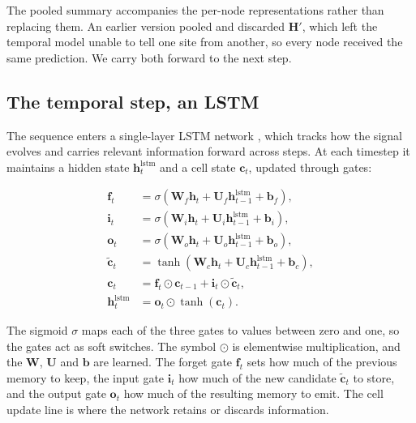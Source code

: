 \documentclass{article}
\begin{document}
The pooled summary accompanies the per-node representations rather than
replacing them. An earlier version pooled and discarded $\mathbf{H}'$, which
left the temporal model unable to tell one site from another, so every node
received the same prediction. We carry both forward to the next step.

\subsection{The temporal step, an LSTM}
\label{sec:lstm}

The sequence enters a single-layer LSTM network \citep{hochreiter1997lstm},
which tracks how the signal evolves and carries relevant information forward
across steps. At each timestep it maintains a hidden state
$\mathbf{h}_t^{\text{lstm}}$ and a cell state $\mathbf{c}_t$, updated through
gates:

\begin{equation}
  \label{eq:lstm}
  \begin{aligned}
    \mathbf{f}_t &= \sigma\!\left( \mathbf{W}_f \mathbf{h}_t + \mathbf{U}_f \mathbf{h}_{t-1}^{\text{lstm}} + \mathbf{b}_f \right), \\
    \mathbf{i}_t &= \sigma\!\left( \mathbf{W}_i \mathbf{h}_t + \mathbf{U}_i \mathbf{h}_{t-1}^{\text{lstm}} + \mathbf{b}_i \right), \\
    \mathbf{o}_t &= \sigma\!\left( \mathbf{W}_o \mathbf{h}_t + \mathbf{U}_o \mathbf{h}_{t-1}^{\text{lstm}} + \mathbf{b}_o \right), \\
    \tilde{\mathbf{c}}_t &= \tanh\!\left( \mathbf{W}_c \mathbf{h}_t + \mathbf{U}_c \mathbf{h}_{t-1}^{\text{lstm}} + \mathbf{b}_c \right), \\
    \mathbf{c}_t &= \mathbf{f}_t \odot \mathbf{c}_{t-1} + \mathbf{i}_t \odot \tilde{\mathbf{c}}_t, \\
    \mathbf{h}_t^{\text{lstm}} &= \mathbf{o}_t \odot \tanh(\mathbf{c}_t).
  \end{aligned}
\end{equation}

The sigmoid $\sigma$ maps each of the three gates to values between zero and
one, so the gates act as soft switches. The symbol $\odot$ is elementwise
multiplication, and the $\mathbf{W}$, $\mathbf{U}$ and $\mathbf{b}$ are
learned. The forget gate $\mathbf{f}_t$ sets how much of the previous memory
to keep, the input gate $\mathbf{i}_t$ how much of the new candidate
$\tilde{\mathbf{c}}_t$ to store, and the output gate $\mathbf{o}_t$ how much of
the resulting memory to emit. The cell update line is where the network
retains or discards information.
\end{document}
